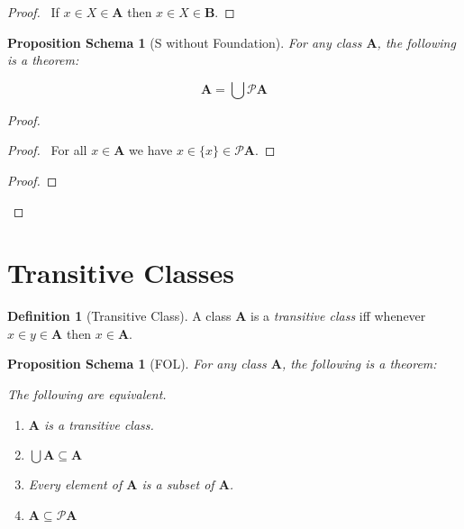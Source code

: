 \documentclass{book}
\let\qed\relax
\newtheorem{props}[ax]{Proposition Schema}
\theoremstyle{definition}
\newtheorem{df}[ax]{Definition}
\begin{document}
\begin{proof}
\pf\ If $x \in X \in \mathbf{A}$ then $x \in X \in \mathbf{B}$. \qed
\end{proof}

\begin{props}[S without Foundation]
\label{prop:UPA}
For any class $\mathbf{A}$, the following is a theorem:

\[ \mathbf{A} = \bigcup \mathcal{P} \mathbf{A} \]
\end{props}

\begin{proof}
\pf
{}
\begin{proof}
	\pf\ For all $x \in \mathbf{A}$ we have $x \in \{x\} \in \mathcal{P} \mathbf{A}$.
\end{proof}
\begin{proof}
\end{proof}
\qed
\end{proof}

\section{Transitive Classes}

\begin{df}[Transitive Class]
A class $\mathbf{A}$ is a \emph{transitive class} iff whenever $x \in y \in \mathbf{A}$ then $x \in \mathbf{A}$.
\end{df}

\begin{props}[FOL]
\label{prop:transitiveset}
For any class $\mathbf{A}$, the following is a theorem:

The following are equivalent.
\begin{enumerate}
\item
$\mathbf{A}$ is a transitive class.
\item
$\bigcup \mathbf{A} \subseteq \mathbf{A}$
\item
Every element of $\mathbf{A}$ is a subset of $\mathbf{A}$.
\item
$\mathbf{A} \subseteq \mathcal{P} \mathbf{A}$
\end{enumerate}
\end{props}
\end{document}
